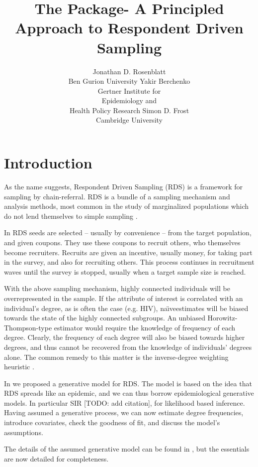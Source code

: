 \documentclass[article]{jss}
\author{Jonathan D. Rosenblatt\\Ben Gurion University \And 
        Yakir Berchenko\\ Gertner Institute for \\ Epidemiology and \\ Health Policy Research \And
        Simon D. Frost\\ Cambridge University}
\title{The \pkg{chords} \proglang{R} Package- A Principled Approach to Respondent Driven Sampling}
\newcommand{\naive}{na\"{\i}ve}
\begin{document}

\section{Introduction}

As the name suggests, Respondent Driven Sampling (RDS) is a framework for sampling by chain-referral.
RDS is a bundle of a sampling mechanism and analysis methods, most common in the study of marginalized populations which do not lend themselves to simple sampling \citep{heckathorn_respondent-driven_1997,heckathorn_respondent-driven_2002}. 

In RDS seeds are selected -- usually by convenience -- from the target population, and given coupons. 
They use these coupons to recruit others, who themselves become recruiters. 
Recruits are given an incentive, usually money, for taking part in the survey, and also for recruiting others.
This process continues in recruitment waves until the survey is stopped, usually when a target sample size is reached.

With the above sampling mechanism, highly connected individuals will be overrepresented in the sample.
If the attribute of interest is correlated with an individual's degree, as is often the case (e.g. HIV), \naive estimates will be biased towards the state of the highly connected subgroups.
An unbiased Horowitz-Thompson-type estimator \citep{horvitz_generalization_1952} would require the knowledge of frequency of each degree. 
Clearly, the frequency of each degree will also be biased towards higher degrees, and thus cannot be recovered from the knowledge of individuals' degrees alone. 
The common remedy to this matter is the inverse-degree weighting heuristic \citep{crawford_hidden_2015,guntuboyina_impossibility_2012}.

In \cite{berchenko_modeling_2013} we proposed a generative model for RDS.
The model is based on the idea that RDS spreads like an epidemic, and we can thus borrow epidemiological generative models. In particular SIR [TODO: add citation], for likelihood based inference.
Having assumed a generative process, we can now estimate degree frequencies, introduce covariates, check the goodness of fit, and discuss the model's assumptions. 

The details of the assumed generative model can be found in \cite{berchenko_modeling_2013}, but the essentials are now detailed for completeness.
\end{document}
